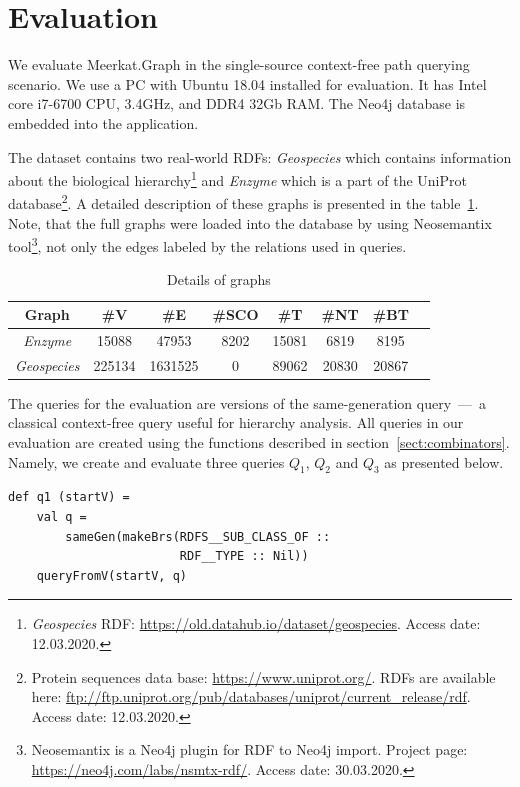 \section{Evaluation}

We evaluate Meerkat.Graph in the single-source context-free path querying scenario.
We use a PC with Ubuntu 18.04 installed for evaluation.
It has Intel core i7-6700 CPU, 3.4GHz, and DDR4 32Gb RAM.
The Neo4j database is embedded into the application.

The dataset contains two real-world RDFs: \emph{Geospecies} which contains information about the biological hierarchy\footnote{\emph{Geospecies} RDF: \url{https://old.datahub.io/dataset/geospecies}. Access date: 12.03.2020.} and \emph{Enzyme} which is a part of the UniProt database\footnote{Protein sequences data base: \url{https://www.uniprot.org/}.
RDFs are available here: \url{ftp://ftp.uniprot.org/pub/databases/uniprot/current_release/rdf}. Access date: 12.03.2020.}.
A detailed description of these graphs is presented in the table~\ref{tbl:datasetDetails}.
Note, that the full graphs were loaded into the database by using Neosemantix tool\footnote{Neosemantix is a Neo4j plugin for RDF to Neo4j import. Project page: \url{https://neo4j.com/labs/nsmtx-rdf/}. Access date: 30.03.2020.}, not only the edges labeled by the relations used in queries.

{
\setlength{\tabcolsep}{4pt}
\begin{table}[ht]
\begin{tabular}{|c|c|c|c|c|c|c|c|}
\hline
 Graph      & \#V & \#E & \#SCO & \#T & \#NT & \#BT \\
 \hline
 \emph{Enzyme}     & 15088  & 47953   & 8202 & 15081 & 6819  & 8195 \\
 \emph{Geospecies} & 225134 & 1631525 & 0    & 89062 & 20830 & 20867 \\
 \hline
\end{tabular}
\caption{Details of graphs}
\label{tbl:datasetDetails}
\end{table}
}

\vspace{-0.75cm}

The queries for the evaluation are versions of the same-generation query~---~a classical context-free query useful for hierarchy analysis.
All queries in our evaluation are created using the functions described in section~\ref{sect:combinators}.
Namely, we create and evaluate three queries $Q_1$, $Q_2$ and $Q_3$ as presented below.

\begin{lstlisting}
def q1 (startV) =
    val q =
        sameGen(makeBrs(RDFS__SUB_CLASS_OF ::
                        RDF__TYPE :: Nil))
    queryFromV(startV, q)
\end{lstlisting}

